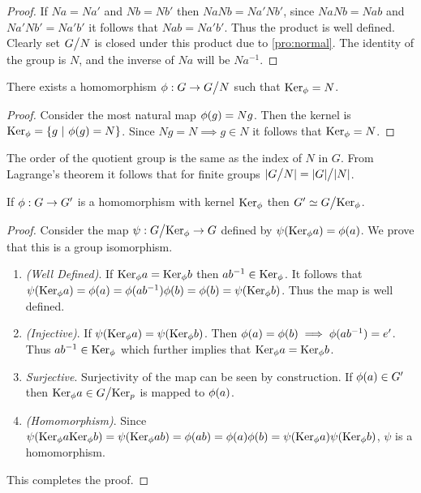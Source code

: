 \begin{proof}
  If $Na = Na'$ and $Nb=Nb'$ then $NaNb = Na'Nb'$, since $NaNb = Nab$ and $Na'Nb' = Na'b'$ it follows that $Nab = Na'b'$. Thus the product is well defined. Clearly set $G\bign/N$ is closed under this product due to \cref{pro:normal}. The identity of the group is $N$, and the inverse of $Na$ will be $Na^{-1}$.
\end{proof}
\begin{proposition}
  There exists a homomorphism $\p: G \to G\bign/N$ such that $\text{Ker}_\phi = N$.
\end{proposition}
\begin{proof}
  Consider the most natural map $\phi(g) = Ng$. Then the kernel is $\text{Ker}_\phi = \{g\ |\ \phi(g) = N\}$. Since $Ng = N \implies g \in N$ it follows that $\text{Ker}_\phi = N$.
\end{proof}
\begin{remark}
  The order of the quotient group is the same as the index of $N$ in $G$. From Lagrange's theorem it follows that for finite groups $|G\bign/N| = |G|\bign/ |N|$.
\end{remark}
\begin{theorem}\label{thm:1it}
  If $\phi:G\to G'$ is a homomorphism with kernel $\text{Ker}_\phi$ then $G' \simeq G\bign/ \Ker_\p$.
\end{theorem}
\begin{proof}
  Consider the map $\psi: G\bign/ \Ker_\p \to G$ defined by $\psi(\text{Ker}_\phi a) = \phi(a)$. We prove that this is a group isomorphism.
  \begin{enumerate}
    \item \textit{(Well Defined)}. If $\text{Ker}_\phi a = \text{Ker}_\phi b$ then $ab^{-1} \in \text{Ker}_\phi$. It follows that $\psi(\text{Ker}_\phi a) = \phi(a) = \phi(ab^{-1})\phi(b) = \phi(b) = \psi(\text{Ker}_\phi b)$. Thus the map is well defined.
    \item \textit{(Injective)}. If $\psi(\text{Ker}_\phi a) = \psi(\text{Ker}_\phi b)$. Then $\phi(a) = \phi(b) \implies \phi(ab^{-1}) = e'$. Thus $ab^{-1} \in \text{Ker}_\phi$ which further implies that $\text{Ker}_\phi a = \text{Ker}_\phi b$.
    \item \textit{Surjective}. Surjectivity of the map can be seen by construction. If $\phi(a)\in G'$ then $\Ker_\p a \in G\bign/ \Ker_p$ is mapped to $\phi(a)$. 
    \item \textit{(Homomorphism)}. Since $\psi(\text{Ker}_\phi a \text{Ker}_\phi b) = \psi(\text{Ker}_\phi ab) = \phi(ab) = \phi(a)\phi(b) = \psi(\text{Ker}_\phi a)\psi(\text{Ker}_\phi b)$, $\psi$ is a homomorphism.
  \end{enumerate}
  This completes the proof.
\end{proof}
